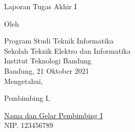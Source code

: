 \clearpage
\pagestyle{empty}

\begin{center}
    \smallskip

    \Large \bfseries \MakeUppercase{\thetitle}
    \vfill

    \Large Laporan Tugas Akhir I
    \vfill

    \large Oleh

    \Large \theauthor

    \large Program Studi Teknik Informatika \\

    \normalsize \normalfont
    Sekolah Teknik Elektro dan Informatika \\
    Institut Teknologi Bandung \\

    \vfill
    \normalsize \normalfont
    Bandung, 21 Oktober 2021 \\
    Mengetahui,

    \vspace{0.5cm}
    Pembimbing I,

    \vfill
    \underline{Nama dan Gelar Pembimbing I} \\
    NIP. 123456789

\end{center}
\clearpage
